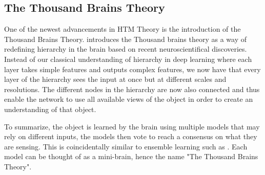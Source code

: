 \subsection{The Thousand Brains Theory}
One of the newest advancements in HTM Theory is the introduction of the Thousand Brains Theory. \textcite{thousandbrains} introduces the Thousand brains theory as a way of redefining hierarchy in the brain based on recent neuroscientifical discoveries. Instead of our classical understanding of hierarchy in deep learning where each layer takes simple features and outputs complex features, we now have that every layer of the hierarchy sees the input at once but at different scales and resolutions. The different nodes in the hierarchy are now also connected and thus enable the network to use all available views of the object in order to create an understanding of that object. \par
To summarize, the object is learned by the brain using multiple models that may rely on different inputs, the models then vote to reach a consensus on what they are sensing. This is coincidentally similar to ensemble learning such as \textcite{divergentNets}. Each model can be thought of as a mini-brain, hence the name "The Thousand Brains Theory".
